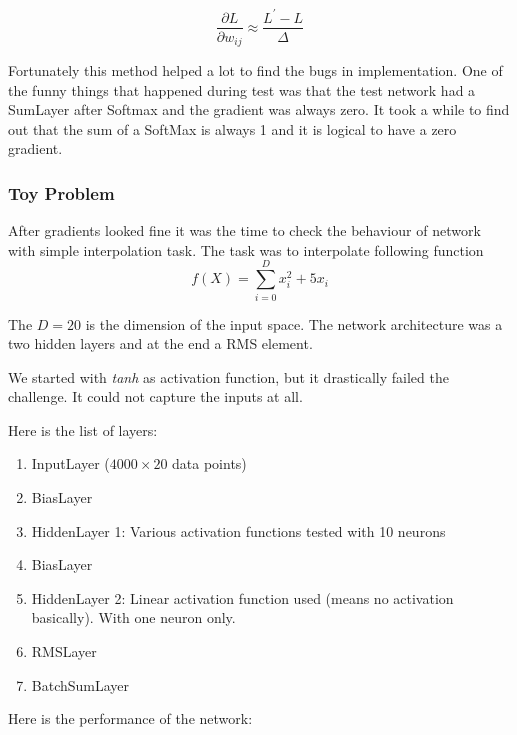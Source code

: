 \begin{equation*}
    \frac{\partial L}{\partial w_{ij}} \approx  \frac{L^{\prime} - L}{\Delta}
\end{equation*}

Fortunately this method helped a lot to find the bugs in implementation. 
One of the funny things that happened during test was that the test network had a SumLayer after Softmax and the gradient was always zero. It took a while to find out that the sum of a SoftMax is always 1 and it is logical to have a zero gradient. 

\subsubsection{Toy Problem}
After gradients looked fine it was the time to check the behaviour of network with simple interpolation task. 
The task was to interpolate following function 
\begin{equation*}
    f(X) = \sum_{i = 0}^{ D} x_i ^ 2 + 5 x_i 
\end{equation*}

The $D = 20$ is the dimension of the input space. The network architecture was a two hidden layers and at the end a RMS element. 

We started with \textit{tanh} as activation function, but it drastically failed the challenge. It  could not capture the inputs at all. 

Here is the list of layers: 
\begin{enumerate}
    \item  InputLayer ($4000 \times 20 $ data points)
    \item BiasLayer 
    \item HiddenLayer 1: Various activation functions tested with 10 neurons     
    \item BiasLayer 
    \item HiddenLayer 2: Linear activation function used (means no activation basically). With one neuron only. 
    \item RMSLayer 
    \item BatchSumLayer 
\end{enumerate}

Here is  the performance of the network:

